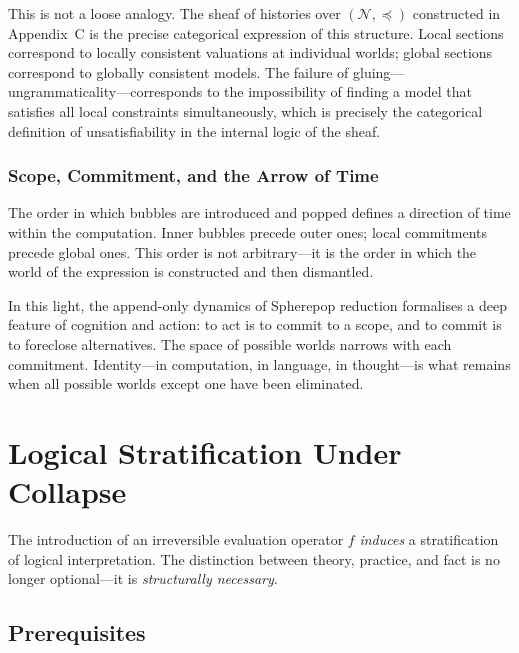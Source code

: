\documentclass[12pt, oneside]{amsbook}
\theoremstyle{plain}
\theoremstyle{definition}
\theoremstyle{remark}
\newcommand{\NF}{\mathcal{N}}
\newcommand{\evalf}{f}
\begin{document}
This is not a loose analogy. The sheaf of histories over $(\NF, \preceq)$
constructed in Appendix~C is the precise categorical expression of this
structure. Local sections correspond to locally consistent valuations at
individual worlds; global sections correspond to globally consistent models.
The failure of gluing---ungrammaticality---corresponds to the impossibility
of finding a model that satisfies all local constraints simultaneously, which
is precisely the categorical definition of unsatisfiability in the internal
logic of the sheaf.

\subsection{Scope, Commitment, and the Arrow of Time}

The order in which bubbles are introduced and popped defines a direction of
time within the computation. Inner bubbles precede outer ones; local
commitments precede global ones. This order is not arbitrary---it is the
order in which the world of the expression is constructed and then dismantled.

In this light, the append-only dynamics of Spherepop reduction formalises a
deep feature of cognition and action: to act is to commit to a scope, and to
commit is to foreclose alternatives. The space of possible worlds narrows with
each commitment. Identity---in computation, in language, in thought---is what
remains when all possible worlds except one have been eliminated.


\chapter{Logical Stratification Under Collapse}
\label{ch:priest}

\begin{tcolorbox}[priest, title={Priest Integration}]
  The introduction of an irreversible evaluation operator $\evalf$
  \emph{induces} a stratification of logical interpretation. The distinction
  between theory, practice, and fact is no longer optional---it is
  \emph{structurally necessary}.
\end{tcolorbox}

\section{Prerequisites}
\end{document}

